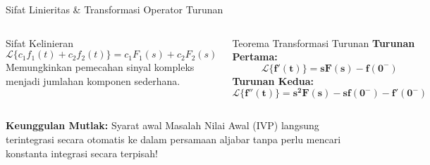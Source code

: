\documentclass[aspectratio=169,10pt]{beamer}
\begin{document}
\begin{frame}{Sifat Linieritas \& Transformasi Operator Turunan}
  \begin{columns}[t]
    \begin{block}{Sifat Kelinieran}
      \begin{equation*}
        \mathcal{L}\{c_1 f_1(t) + c_2 f_2(t)\} = c_1 F_1(s) + c_2 F_2(s)
      \end{equation*}
      Memungkinkan pemecahan sinyal kompleks menjadi jumlahan komponen sederhana.
    \end{block}

    \begin{alertblock}{Teorema Transformasi Turunan}
      \textbf{Turunan Pertama:}
      \begin{equation*}
        \mathbf{\mathcal{L}\{f'(t)\} = s F(s) - f(0^-)}
      \end{equation*}
      \textbf{Turunan Kedua:}
      \begin{equation*}
        \mathbf{\mathcal{L}\{f''(t)\} = s^2 F(s) - s f(0^-) - f'(0^-)}
      \end{equation*}
    \end{alertblock}
  \end{columns}
  \vspace{0.2cm}
  \textbf{Keunggulan Mutlak:} Syarat awal Masalah Nilai Awal (IVP) langsung terintegrasi secara otomatis ke dalam persamaan aljabar tanpa perlu mencari konstanta integrasi secara terpisah!
\end{frame}
\end{document}
